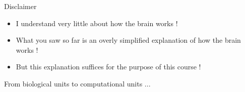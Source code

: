 \documentclass[serif, aspectratio=169]{beamer}
\begin{document}
\begin{frame}
\begin{columns}
\begin{overlayarea}{\textwidth}{\textheight}



\end{overlayarea}
\end{columns}
\end{frame}

\begin{frame}
\begin{block}{Disclaimer}
\begin{itemize}\justifying
\item I understand very little about how the brain works !
\item What you saw so far is an overly simplified explanation of how the brain works !
\item But this explanation suffices for the purpose of this course !
\end{itemize}
\end{block}
\end{frame}

\begin{frame}
From biological units to computational units ...
\end{frame}
\end{document}
